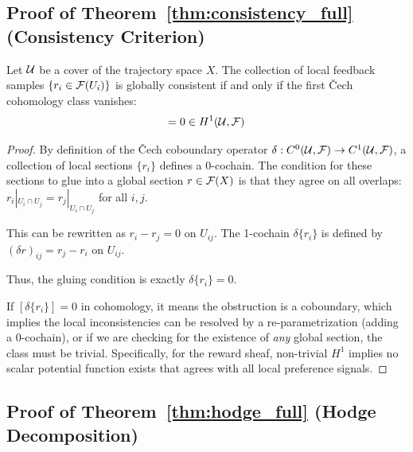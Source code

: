 \subsection{Proof of Theorem~\ref{thm:consistency_full} (Consistency Criterion)}

\begin{theorem}
\label{thm:consistency_full}
Let $\mathcal{U}$ be a cover of the trajectory space $X$. The collection of local feedback samples $\{r_i \in \mathcal{F}(U_i)\}$ is globally consistent if and only if the first \v{C}ech cohomology class vanishes:
\begin{equation}
[\delta \{r_i\}] = 0 \in H^1(\calU, \calF)
\end{equation}
\end{theorem}

\begin{proof}
By definition of the \v{C}ech coboundary operator $\delta: C^0(\mathcal{U}, \mathcal{F}) \to C^1(\mathcal{U}, \mathcal{F})$, a collection of local sections $\{r_i\}$ defines a 0-cochain. The condition for these sections to glue into a global section $r \in \mathcal{F}(X)$ is that they agree on all overlaps: $r_i|_{U_i \cap U_j} = r_j|_{U_i \cap U_j}$ for all $i, j$.

This can be rewritten as $r_i - r_j = 0$ on $U_{ij}$. The 1-cochain $\delta \{r_i\}$ is defined by $(\delta r)_{ij} = r_j - r_i$ on $U_{ij}$.

Thus, the gluing condition is exactly $\delta \{r_i\} = 0$.

If $[\delta \{r_i\}] = 0$ in cohomology, it means the obstruction is a coboundary, which implies the local inconsistencies can be resolved by a re-parametrization (adding a 0-cochain), or if we are checking for the existence of \emph{any} global section, the class must be trivial. Specifically, for the reward sheaf, non-trivial $H^1$ implies no scalar potential function exists that agrees with all local preference signals.
\end{proof}

\subsection{Proof of Theorem~\ref{thm:hodge_full} (Hodge Decomposition)}

